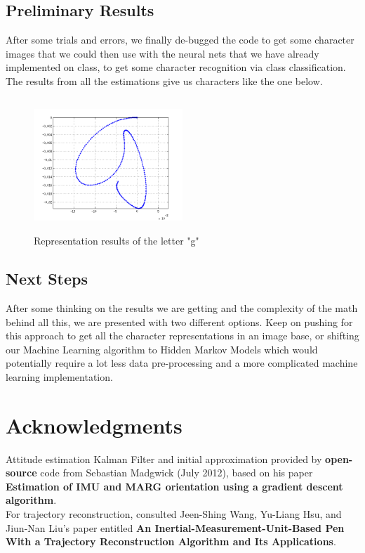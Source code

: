 \documentclass{article}
\begin{document}
\subsection{Preliminary Results}
After some trials and errors, we finally de-bugged the code to get some character images that we could then use with the neural nets that we have already implemented on class, to get some character recognition via class classification.
The results from all the estimations give us characters like the one below.
\begin{figure}[H]
\centering
    \includegraphics[width=0.5\textwidth, height= 5cm]{g.png}
    \caption{Representation results of the letter "g"}
\end{figure}


\subsection{Next Steps}
After some thinking on the results we are getting and the complexity of the math behind all this, we are presented with two different options. Keep on pushing for this approach to get all the character representations in an image base, or shifting our Machine Learning algorithm to Hidden Markov Models which would potentially require a lot less data pre-processing and a more complicated machine learning implementation.
 
\section*{Acknowledgments} 
 
Attitude estimation Kalman Filter and initial approximation provided by \textbf{open-source} code from Sebastian Madgwick (July 2012), based on his paper \textbf{Estimation of IMU and MARG orientation using a gradient descent algorithm}.\\
For trajectory reconstruction, consulted Jeen-Shing Wang, Yu-Liang Hsu, and Jiun-Nan Liu's paper entitled \textbf{An Inertial-Measurement-Unit-Based Pen With a Trajectory Reconstruction Algorithm and Its Applications}.


\end{document}
